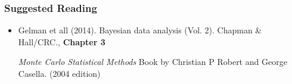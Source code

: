 \documentclass[10pt]{beamer}
\begin{document}
\begin{frame}
  \frametitle{Suggested Reading}

  \begin{itemize}
  \item Gelman et all (2014). Bayesian data
    analysis (Vol. 2). Chapman \& Hall/CRC., \textbf{Chapter 3}


    \emph{Monte Carlo Statistical Methods} Book by Christian P Robert and George
    Casella. (2004 edition)

  \end{itemize}

\end{frame}
\end{document}
